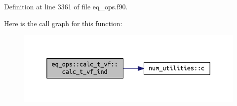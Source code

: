 Definition at line 3361 of file eq\+\_\+ops.\+f90.

Here is the call graph for this function\+:
\nopagebreak
\begin{figure}[H]
\begin{center}
\leavevmode
\includegraphics[width=350pt]{interfaceeq__ops_1_1calc__t__vf_a03e04d9c0e2c6f839c578a092bbe47ee_cgraph}
\end{center}
\end{figure}


